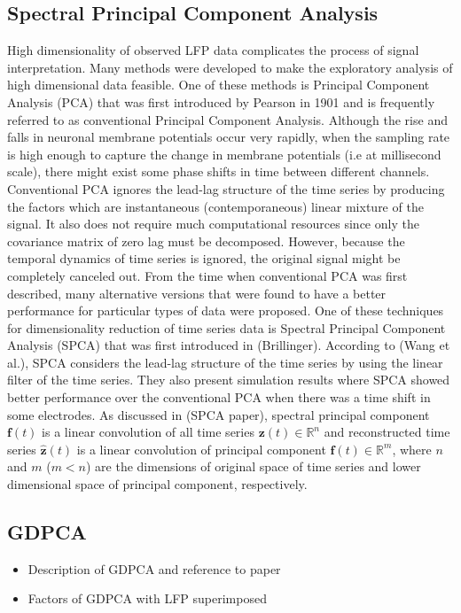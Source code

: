 \documentclass[12pt]{article}
\begin{document}
\subsection{Spectral Principal Component Analysis} \label{sec:spca}
High dimensionality of observed LFP data complicates the process of signal interpretation. Many methods were developed to make the exploratory analysis of high dimensional data feasible. One of these methods is Principal Component Analysis (PCA) that was first introduced by Pearson in 1901 and is frequently referred to as conventional Principal Component Analysis.  Although the rise and falls in neuronal membrane potentials occur very rapidly, when the sampling rate is high enough to capture the change in membrane potentials (i.e at millisecond scale), there might exist some phase shifts in time between different channels. Conventional PCA ignores the lead-lag structure of the time series by producing the factors which are instantaneous (contemporaneous) linear mixture of the signal. It also does not require much computational resources since only the covariance matrix of zero lag must be decomposed. However, because the temporal dynamics of time series is ignored, the original signal might be completely canceled out. From the time when conventional PCA was first described, many alternative versions that were found to have a better performance for particular types of data were proposed. One of these techniques for dimensionality reduction of time series data is Spectral Principal Component Analysis (SPCA) that was first introduced in (Brillinger). According to (Wang et al.), SPCA considers the lead-lag structure of the time series by using the linear filter of the time series. They also present simulation results where SPCA showed better performance over the conventional PCA when there was a time shift in some electrodes. As discussed in (SPCA paper), spectral principal component $\mathbf{f}(t)$ is a linear convolution of all time series $\mathbf{z}(t) \in \mathbb{R}^{n}$ and reconstructed time series $\mathbf{\hat{z}}(t)$ is a linear convolution of principal component $\mathbf{f}(t) \in \mathbb{R}^{m}$, where $\mathit{n}$ and $\mathit{m}$ ($\mathit{m<n}$) are the dimensions of original space of time series and lower dimensional space of principal component, respectively. 



\subsection{GDPCA} \label{sec:gdpca}
\begin{itemize}
\item  Description of GDPCA and reference to paper
\item Factors of GDPCA with LFP superimposed
\end{itemize}
\end{document}
